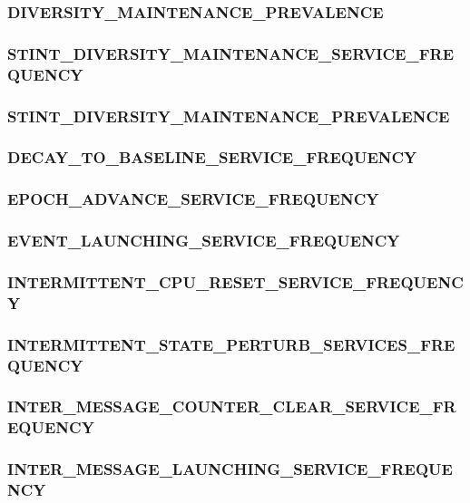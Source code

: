 \subsubsection{DIVERSITY\_MAINTENANCE\_PREVALENCE}

\subsubsection{STINT\_DIVERSITY\_MAINTENANCE\_SERVICE\_FREQUENCY}

\subsubsection{STINT\_DIVERSITY\_MAINTENANCE\_PREVALENCE}

\subsubsection{DECAY\_TO\_BASELINE\_SERVICE\_FREQUENCY}

\subsubsection{EPOCH\_ADVANCE\_SERVICE\_FREQUENCY}

\subsubsection{EVENT\_LAUNCHING\_SERVICE\_FREQUENCY}

\subsubsection{INTERMITTENT\_CPU\_RESET\_SERVICE\_FREQUENCY}

\subsubsection{INTERMITTENT\_STATE\_PERTURB\_SERVICES\_FREQUENCY}

\subsubsection{INTER\_MESSAGE\_COUNTER\_CLEAR\_SERVICE\_FREQUENCY}

\subsubsection{INTER\_MESSAGE\_LAUNCHING\_SERVICE\_FREQUENCY}

